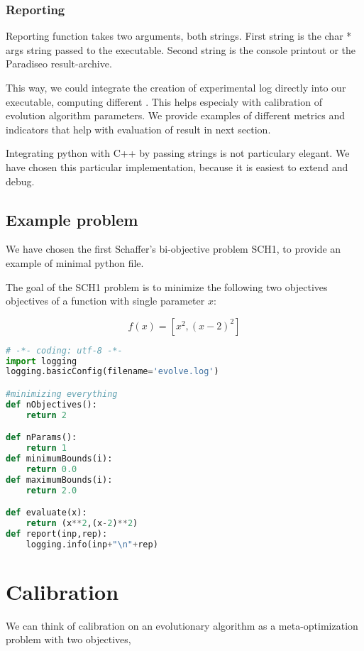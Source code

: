 \documentclass[12pt,oneside]{fithesis2}
\begin{document}
\subsection{Reporting}

Reporting function takes two arguments, both strings. First string is the char * args string passed to the executable. Second string is the console printout or the Paradiseo result-archive.

This way, we could integrate the creation of experimental log directly into our executable, computing different . This helps especialy with calibration of evolution algorithm parameters.
We provide examples of different metrics and indicators that help with evaluation of result in next section.

Integrating python with C++ by passing strings is not particulary elegant. We have chosen this particular implementation, because it is easiest to extend and debug.

\section{Example problem}

We have chosen the first Schaffer's bi-objective problem SCH1, to provide an example of minimal python file.

The goal of the SCH1 problem is to minimize the following two objectives objectives of a function with single parameter $x$:

$$f(x) = [x^2,(x-2)^2]$$

\begin{lstlisting}[language=Python,label=min_example,caption=Minimal working example]
# -*- coding: utf-8 -*-
import logging
logging.basicConfig(filename='evolve.log')

#minimizing everything 
def nObjectives():
	return 2

def nParams():
	return 1
def minimumBounds(i):
	return 0.0
def maximumBounds(i):
	return 2.0

def evaluate(x):
	return (x**2,(x-2)**2)
def report(inp,rep):
	logging.info(inp+"\n"+rep) 
\end{lstlisting}

\chapter{Calibration}
\label{chap:calib}
We can think of calibration on an evolutionary algorithm as a meta-optimization problem with two objectives, 
\end{document}
